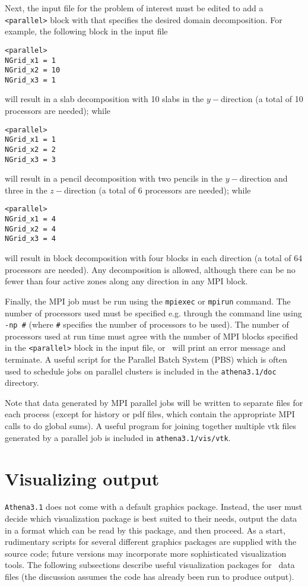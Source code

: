Next, the input file for the problem of interest must be edited to add
a {\tt <parallel>} block with that specifies the desired domain decomposition.
For example, the following block in the input file
\begin{verbatim}
<parallel>
NGrid_x1 = 1
NGrid_x2 = 10
NGrid_x3 = 1
\end{verbatim}
will result in a slab decomposition with 10 slabs in the $y-$direction
(a total of 10 processors are needed); while
\begin{verbatim}
<parallel>
NGrid_x1 = 1
NGrid_x2 = 2
NGrid_x3 = 3
\end{verbatim}
will result in a pencil decomposition with two pencils in the $y-$direction and
three in the $z-$direction (a total of 6 processors are needed); while
\begin{verbatim}
<parallel>
NGrid_x1 = 4
NGrid_x2 = 4
NGrid_x3 = 4
\end{verbatim}
will result in block decomposition with four blocks in each direction
(a total of 64 processors are needed).  Any decomposition is allowed,
although there can be no fewer than four active zones along any direction
in any MPI block.

Finally, the MPI job must be run using the {\tt mpiexec} or {\tt mpirun}
command.  The number of processors used must be specified e.g. through the
command line using {\tt -np \#} (where {\tt \#} specifies the number of
processors to be used).  The number of processors used at run time must
agree with the number of MPI blocks specified in the {\tt <parallel>}
block in the input file, or \ath\ will print an error message and
terminate.  A useful script for the Parallel Batch System (PBS) which
is often used to schedule jobs on parallel clusters is included in the
{\tt athena3.1/doc} directory.

Note that data generated by MPI parallel jobs will be written to separate files
for each process (except for history or pdf files, which contain the
appropriate MPI calls to do global sums).  A useful program for joining
together multiple vtk files generated by a parallel job is
included in {\tt athena3.1/vis/vtk}.

\section{Visualizing output}

{\tt Athena3.1} does not come with a default graphics package.  Instead,
the user must decide which visualization package is best suited to their
needs, output the data in a format which can be read by this package,
and then proceed.  As a start, rudimentary scripts for several different
graphics packages are supplied with the source code; future versions
may incorporate more sophisticated visualization tools.  The following
subsections describe useful visualization packages for \ath\ data files
(the discussion assumes the code has already been run to produce output).


